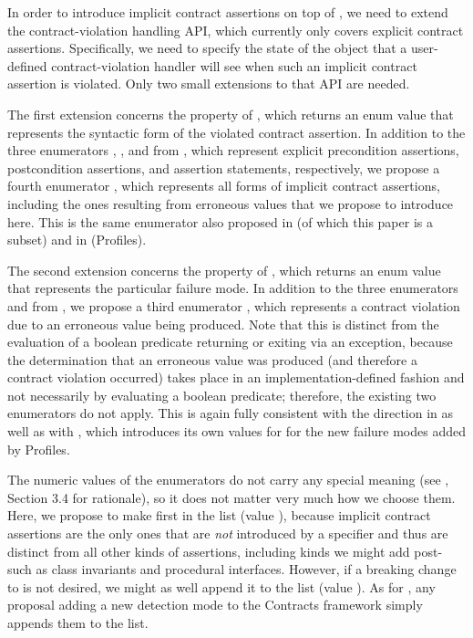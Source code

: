 In order to introduce implicit contract assertions on top of \cite{P2900R13}, we need to extend the contract-violation handling API, which currently only covers explicit contract assertions. Specifically, we need to specify the state of the \mbox{} object that a user-defined contract-violation handler will see when such an implicit contract assertion is violated. Only two small extensions to that API are needed. 

The first extension concerns the  property of , which returns an enum value that represents the syntactic form of the violated contract assertion. In addition to the three enumerators , , and  from \cite{P2900R13}, which represent explicit precondition assertions, postcondition assertions, and assertion statements, respectively, we propose a fourth enumerator , which represents all forms of implicit contract assertions, including the ones resulting from erroneous values that we propose to introduce here. This is the same enumerator also proposed in \cite{P3100R1} (of which this paper is a subset) and in \cite{P3081R1} (Profiles).

The second extension concerns the  property of , which returns an enum value that represents the particular failure mode. In addition to the three enumerators  and  from \cite{P2900R13}, we propose a third enumerator , which represents a contract violation due to an erroneous value being produced. Note that this is distinct from the evaluation of a boolean predicate returning  or exiting via an exception, because the determination that an erroneous value was produced (and therefore a contract violation occurred) takes place in an implementation-defined fashion and not necessarily by evaluating a boolean predicate; therefore, the existing two enumerators do not apply. This is again fully consistent with the direction in \cite{P3100R1} as well as with \cite{P3081R1}, which introduces its own values for  for the new failure modes added by Profiles.

The numeric values of the enumerators do not carry any special meaning (see \cite{P3327R0}, Section 3.4 for rationale), so it does not matter very much how we choose them. Here, we propose to make  first in the list (value  ), because implicit contract assertions are the only ones that are \emph{not} introduced by a specifier and thus are distinct from all other kinds of assertions, including kinds we might add post-\cite{P2900R13} such as class invariants and procedural interfaces. However, if a breaking change to \cite{P2900R13} is not desired, we might as well  append it to the list (value ). As for , any proposal adding a new detection mode to the Contracts framework simply appends them to the list.

